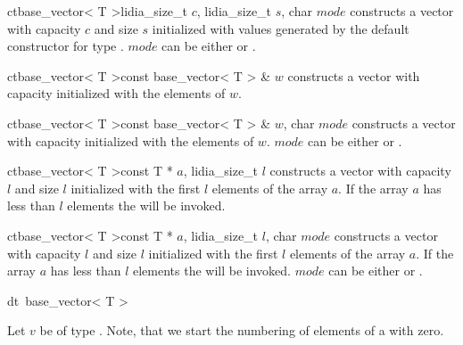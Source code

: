 \begin{fcode}{ct}{base_vector< T >}{lidia_size_t $c$, lidia_size_t $s$, char $\mathit{mode}$}
  constructs a vector with capacity $c$ and size $s$ initialized with values generated by the
  default constructor for type .  $\mathit{mode}$ can be either  or
  .
\end{fcode}

\begin{fcode}{ct}{base_vector< T >}{const base_vector< T > & $w$}
  constructs a vector with capacity  initialized with the elements of $w$.
\end{fcode}

\begin{fcode}{ct}{base_vector< T >}{const base_vector< T > & $w$, char $\mathit{mode}$}
  constructs a vector with capacity  initialized with the elements of $w$.
  $\mathit{mode}$ can be either  or .
\end{fcode}

\begin{fcode}{ct}{base_vector< T >}{const T * $a$, lidia_size_t $l$}
  constructs a vector with capacity $l$ and size $l$ initialized with the first $l$ elements of
  the array $a$.  If the array $a$ has less than $l$ elements the \LEH will be invoked.
\end{fcode}

\begin{fcode}{ct}{base_vector< T >}{const T * $a$, lidia_size_t $l$, char $\mathit{mode}$}
  constructs a vector with capacity $l$ and size $l$ initialized with the first $l$ elements of
  the array $a$.  If the array $a$ has less than $l$ elements the \LEH will be invoked.
  $\mathit{mode}$ can be either  or .
\end{fcode}

\begin{fcode}{dt}{~base_vector< T >}{}
\end{fcode}



\ACCS

Let $v$ be of type .  Note, that we start the numbering of elements of a
 with zero.




